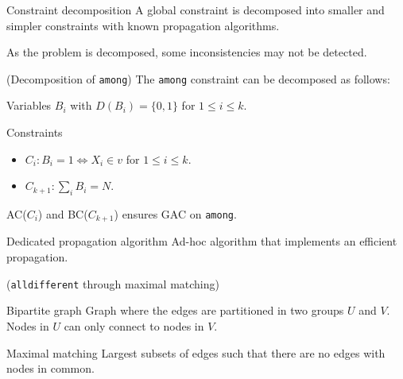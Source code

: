 \begin{descriptionlist}
    \item[Constraint decomposition] 
        A global constraint is decomposed into smaller and simpler constraints with known propagation algorithms.
        \begin{remark}
            As the problem is decomposed, some inconsistencies may not be detected.
        \end{remark}

        \begin{example}(Decomposition of \texttt{among})
            The \texttt{among} constraint can be decomposed as follows:
            \begin{descriptionlist}
                \item[Variables]
                    $B_i$ with $D(B_i) = \{ 0, 1 \}$ for $1 \leq i \leq k$.
                \item[Constraints] \phantom{}
                    \begin{itemize}
                        \item $C_i: B_i = 1 \iff X_i \in v$ for $1 \leq i \leq k$.
                        \item $C_{k+1}: \sum_{i} B_i = N$.
                    \end{itemize}
            \end{descriptionlist}
            AC($C_i$) and BC($C_{k+1}$) ensures GAC on \texttt{among}.
        \end{example}
    
    \item[Dedicated propagation algorithm] 
        Ad-hoc algorithm that implements an efficient propagation.

        \begin{example}(\texttt{alldifferent} through maximal matching)
            \begin{descriptionlist}
                \item[Bipartite graph] 
                    Graph where the edges are partitioned in two groups $U$ and $V$.
                    Nodes in $U$ can only connect to nodes in $V$.

                \item[Maximal matching]
                    Largest subsets of edges such that there are no edges with nodes in common.
            \end{descriptionlist}


\end{example}
\end{descriptionlist}
